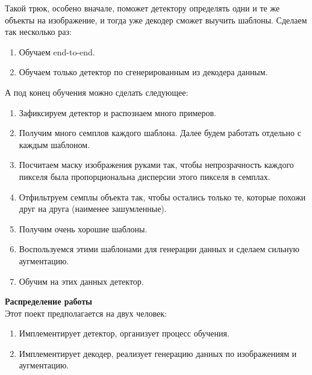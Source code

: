 \documentclass[12pt]{article}
\newenvironment{MyList}[1][4pt]{
	\begin{enumerate}[1.]
		\setlength{\parskip}{0pt}
		\setlength{\itemsep}{#1}
	}{       
	\end{enumerate}
}
\begin{document}
	Такой трюк, особено вначале, поможет детектору определять одни и те же объекты на изображение, и тогда уже декодер сможет выучить шаблоны. Сделаем так несколько раз:
	\begin{MyList}
		\item Обучаем end-to-end.
		\item Обучаем только детектор по сгенерированным из декодера данным.
	\end{MyList}
	
	А под конец обучения можно сделать следующее:
	\begin{MyList}
		\item Зафиксируем детектор и распознаем много примеров.
		\item Получим много семплов каждого шаблона. Далее будем работать отдельно с каждым шаблоном.
		\item Посчитаем маску изображения руками так, чтобы непрозрачность каждого пикселя была пропорциональна дисперсии этого пикселя в семплах.
		\item Отфильтруем семплы объекта так, чтобы остались только те, которые похожи друг на друга (наименее зашумленные).
		\item Получим очень хорошие шаблоны. 
		\item Воспользуемся этими шаблонами для генерации данных и сделаем сильную аугментацию. 
		\item Обучим на этих данных детектор.
	\end{MyList}

	\textbf{Распределение работы}\\
	Этот поект предполагается на двух человек:
	\begin{MyList}
		\item Имплементирует детектор, организует процесс обучения.
		\item Имплементирует декодер, реализует генерацию данных по изображениям и аугментацию.
	\end{MyList}
	
\end{document}
